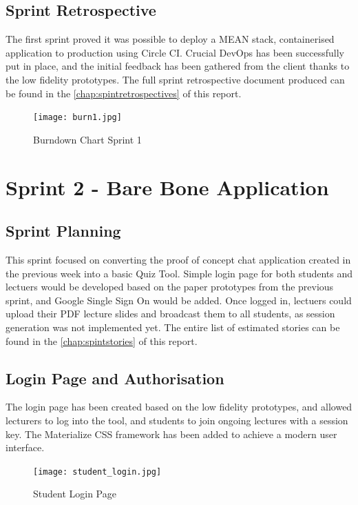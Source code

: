 \newpage
\subsection{Sprint Retrospective}
The first sprint proved it was possible to deploy a MEAN stack, containerised application
to production using Circle CI. Crucial DevOps has been successfully put in place, and the
initial feedback has been gathered from the client thanks to the low fidelity prototypes.
The full sprint retrospective document produced can be found in the \autoref{chap:spintretrospectives} of this report.

\begin{figure}[ht]
    \centering
    \texttt{[image: burn1.jpg]}
    \caption{Burndown Chart Sprint 1}
    \label{fig:burn1}
\end{figure}

\newpage
\section{Sprint 2 - Bare Bone Application}
\subsection{Sprint Planning}
This sprint focused on converting the proof of concept chat application created in the previous
week into a basic Quiz Tool. Simple login page for both students and lectuers
would be developed based on the paper prototypes from the previous sprint, and Google Single Sign
On would be added. Once logged in, lectuers could upload their PDF lecture slides and broadcast
them to all students, as session generation was not implemented yet. The entire list of estimated stories
can be found in the \autoref{chap:spintstories} of this report.

\newpage
\subsection{Login Page and Authorisation}
The login page has been created based on the low fidelity prototypes, and allowed
lecturers to log into the tool, and students to join ongoing lectures with a session key.
The Materialize\cite{43} CSS framework has been added to achieve a modern user interface.

\begin{figure}[h!]
    \centering
    \texttt{[image: student\_login.jpg]}
    \caption{Student Login Page}
    \label{fig:studentlogin}
\end{figure}

